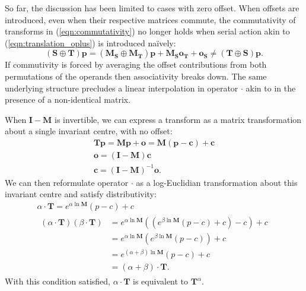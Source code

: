 		    So far, the discussion has been limited to cases with zero offset. When offsets are introduced, even when their respective matrices commute, the commutativity of transforms in (\ref{eqn:commutativity}) no longer holds when serial action akin to (\ref{eqn:translation_oplus}) is introduced na\"ively:
        \begin{equation}
          (\mathbf{S} \oplus \mathbf{T})\mathbf{p} = (\mathbf{M_S} \oplus \mathbf{M_T})\mathbf{p} + \mathbf{M_So_T} + \mathbf{o_S} \ne (\mathbf{T} \oplus \mathbf{S})\mathbf{p}.
        \end{equation}
        If commutivity is forced by averaging the offset contributions from both permutations of the operands then associativity breaks down. The same underlying structure precludes a linear interpolation in operator $\cdot$ akin to  in the presence of a non-identical matrix.

        When $\mathbf{I} - \mathbf{M}$ is invertible, we can express a transform as a matrix transformation about a single invariant centre, with no offset:
        \begin{gather}
          \mathbf{Tp} = \mathbf{Mp} + \mathbf{o} = \mathbf{M}(\mathbf{p}-\mathbf{c}) + \mathbf{c} \\
          \mathbf{o} = (\mathbf{I} - \mathbf{M})\mathbf{c} \\
          \mathbf{c} = (\mathbf{I} - \mathbf{M})^{-1}\mathbf{o}.
        \end{gather}
        We can then reformulate operator $\cdot$ as a log-Euclidian transformation about this invariant centre and satisfy distributivity:
        \begin{gather}
          \alpha \cdot \mathbf{T} = e^{\alpha\ln\mathbf{M}}(p - c) + c \label{eqn:affine_cdot} \\
          \begin{split}
            (\alpha \cdot \mathbf{T})(\beta \cdot \mathbf{T}) &= e^{\alpha\ln\mathbf{M}}((e^{\beta\ln\mathbf{M}}(p - c) + c) - c) + c \\
                                                              &= e^{\alpha\ln\mathbf{M}}(e^{\beta\ln\mathbf{M}}(p - c)) + c \\
                                                              &= e^{(\alpha + \beta)\ln\mathbf{M}}(p - c) + c \\
                                                              &= (\alpha + \beta) \cdot \mathbf{T}.
          \end{split}
        \end{gather}
        With this condition satisfied, $\alpha\cdot\mathbf{T}$ is equivalent to $\mathbf{T}^{\alpha}$.
        
